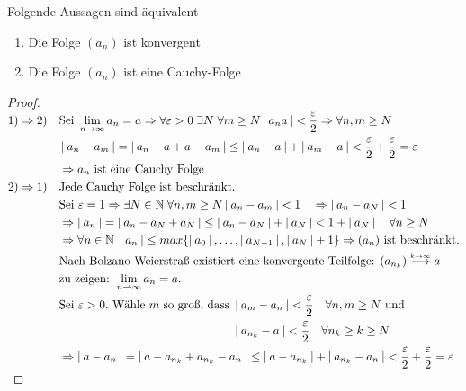 \documentclass[a4paper,titlepage,oneside]{article}
\def\N{\ensuremath{\mathbb{N}} }
\renewcommand{\epsilon}{\ensuremath{\varepsilon} }
\def\zz{\text{zu zeigen: }}
\def\sp{\hspace{0,1cm}}
\renewcommand{\liminf}[2][n]{\ensuremath{\lim\limits_{#1 \rightarrow \infty}{#2}}}
\newcommand{\abs}[1]{\ensuremath{\left|\:#1\:\right|}}
\newcommand{\longtoinf}[1][n]{\ensuremath{\overset{\scriptscriptstyle{#1 \to \infty}}{\longrightarrow}}}
\theoremstyle{thmstyle}
\begin{document}
\begin{subsatz}
Folgende Aussagen sind äquivalent
\begin{enumerate}
\item Die Folge \((a_n)\) ist konvergent
\item Die Folge \((a_n)\) ist eine Cauchy-Folge
\end{enumerate}
\begin{proof}
\begin{math} \displaystyle
\begin{aligned}[t]
1) \Rightarrow 2) \quad &\text{Sei }\liminf{a_n} = a \Rightarrow \forall \epsilon > 0 \sp \exists N \sp \forall m \ge N \abs{a_n a} < \frac{\epsilon}{2} \Rightarrow \forall n, m \ge N \\
&\abs{a_n - a_m} = \abs{a_n - a + a - a_m} \le \abs{a_n - a }  + \abs{a_m - a} <  \frac{\epsilon}{2}+ \frac{\epsilon}{2} = \epsilon \\
&\Rightarrow a_n \text{ ist eine Cauchy Folge}\\
2) \Rightarrow 1) \quad &\text{Jede Cauchy Folge ist beschränkt.} \\
& \text{Sei } \epsilon = 1 \Rightarrow \exists N \in \N \sp \forall n, m \ge N \abs{a_n - a_m} < 1 \quad \Rightarrow \abs{a_n - a_N} < 1 \\
&\Rightarrow \abs{a_n} = \abs{a_n - a_N + a_N} \le \abs{a_n - a_N} + \abs{a_N} < 1 + \abs{a_N} \quad \forall n  \ge N\\
&\Rightarrow \forall n \in \N \sp \abs{a_n} \le max\{\abs{a_0},\dots,\abs{a_{N-1}},\abs{a_N} + 1\} \Rightarrow (a_n) \text{ ist beschränkt.}\\
&\text{Nach Bolzano-Weierstraß existiert eine konvergente Teilfolge: } (a_{n_k}) \longtoinf[k] a\\
&\zz \liminf{a_n} = a.\\
&\text{Sei }\epsilon > 0. \text{ Wähle $m$ so groß, dass }\begin{aligned}[t]&\abs{a_m - a_n} < \frac{\epsilon}{2} \quad \forall n,m \ge N \text{ und } \\
&\abs{a_{n_k} - a} < \frac{\epsilon}{2} \quad \forall n_k \ge k \ge N \end{aligned} \\
&\Rightarrow \abs{a-a_n} = \abs{a - a_{n_k} + a_{n_k} - a_n} \le \abs{a- a_{n_k}} + \abs{a_{n_k} - a_n} < \frac{\epsilon}{2} + \frac{\epsilon}{2} = \epsilon
\end{aligned}\\
\end{math}
\end{proof}
\end{subsatz}
\end{document}
